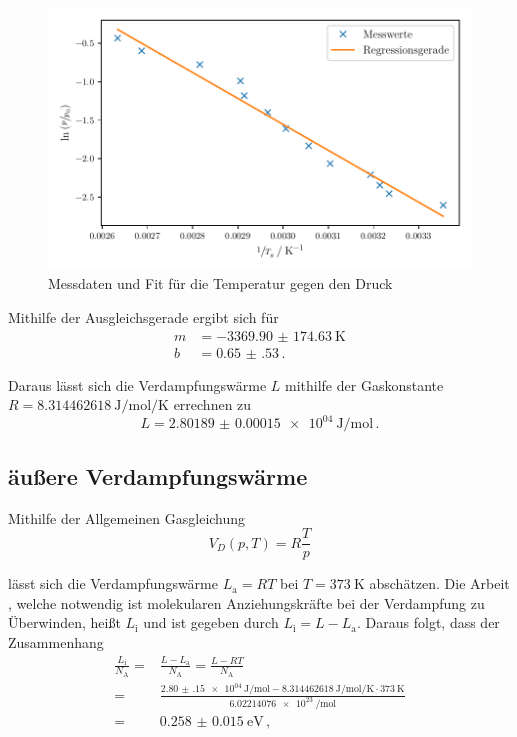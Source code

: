 \begin{figure}
    \centering
    \caption{Messdaten und Fit für die Temperatur gegen den Druck}
    \label{fig:1}
    \includegraphics{Daten/tiefdruck.pdf}
\end{figure}

\noindent
Mithilfe der Ausgleichsgerade ergibt sich für 
\begin{align*}
    m &= \SI{-3369.90(17463)}{\kelvin}\\
    b &= \SI{0.65(53)} \, .
\end{align*}

\noindent 
Daraus lässt sich die Verdampfungswärme $L$ mithilfe der Gaskonstante $R = \SI{8,314462618}{\joule\per\mole\per\kelvin}$\cite{gasconstant} errechnen zu 
\begin{equation*}
    L = \SI{2.80189(15)e04}{\joule\per\mole} \, .
\end{equation*}

\subsection{äußere Verdampfungswärme}
Mithilfe der Allgemeinen Gasgleichung 
\begin{equation*}
    V_D(p,T) =R \frac{T}{p} 
\end{equation*}

\noindent
lässt sich die Verdampfungswärme $L_\text{a} = RT$ bei $T = \SI{373}{\kelvin}$ abschätzen. Die Arbeit , welche notwendig ist molekularen Anziehungskräfte bei der Verdampfung zu Überwinden, heißt 
$L_\text{i}$ und ist gegeben durch $ L_\text{i} = L - L_\text{a}$. Daraus folgt, dass der Zusammenhang
\begin{align*}
    \frac{L_\text{i}}{N_\text{A}} =& \frac{L - L_\text{a}}{N_\text{A}} = \frac{L - RT}{N_\text{A}} \\
    =& \frac{\SI{2.80(15)e04}{\joule\per\mole} - \SI{8,314462618}{\joule\per\mole\per\kelvin} \cdot \SI{373}{\kelvin}}{\SI{6.02214076e23}{\per\mole}} \\
    =& \SI{0.258(15)}{\electronvolt} \, ,
\end{align*}

